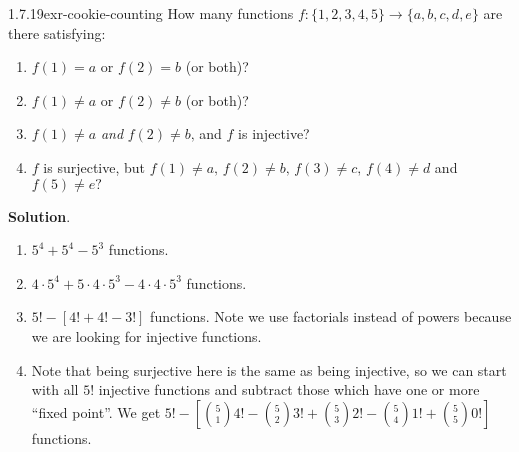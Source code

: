 \documentclass[twoside,11pt,]{book}
\numberwithin{equation}{chapter}
\begin{document}
\begin{divisionsolution}{1.7.19}{}{exr-cookie-counting}%
\hypertarget{p-2892}{}%
How many functions \(f: \{1,2,3,4,5\} \to \{a,b,c,d,e\}\) are there satisfying:\leavevmode%
\begin{enumerate}[label=(\alph*)]
\item\hypertarget{li-1684}{}\hypertarget{p-2893}{}%
\(f(1) = a\) or \(f(2) = b\) (or both)?%
\item\hypertarget{li-1685}{}\hypertarget{p-2895}{}%
\(f(1) \ne a\) or \(f(2) \ne b\) (or both)?%
\item\hypertarget{li-1686}{}\hypertarget{p-2897}{}%
\(f(1) \ne a\) \emph{and} \(f(2) \ne b\text{,}\) and \(f\) is injective?%
\item\hypertarget{li-1687}{}\hypertarget{p-2899}{}%
\(f\) is surjective, but \(f(1) \ne a\text{,}\) \(f(2) \ne b\text{,}\) \(f(3) \ne c\text{,}\) \(f(4) \ne d\) and \(f(5) \ne e\text{?}\)%
\end{enumerate}
%
\par\smallskip%
\noindent\textbf{Solution}.\quad%
\hypertarget{p-2901}{}%
\leavevmode%
\begin{enumerate}[label=(\alph*)]
\item\hypertarget{li-1688}{}\hypertarget{p-2902}{}%
\(5^4 + 5^4 - 5^3\) functions.%
\item\hypertarget{li-1689}{}\hypertarget{p-2903}{}%
\(4\cdot 5^4 + 5 \cdot 4 \cdot 5^3 - 4 \cdot 4 \cdot 5^3\) functions.%
\item\hypertarget{li-1690}{}\hypertarget{p-2904}{}%
\(5! - \left[ 4! + 4! - 3! \right]\) functions. Note we use factorials instead of powers because we are looking for injective functions.%
\item\hypertarget{li-1691}{}\hypertarget{p-2905}{}%
Note that being surjective here is the same as being injective, so we can start with all \(5!\) injective functions and subtract those which have one or more ``fixed point''. We get \(5! - \left[{5 \choose 1}4! - {5 \choose 2}3! + {5 \choose 3}2! - {5 \choose 4}1! + {5 \choose 5} 0!\right]\) functions.%
\end{enumerate}
%
\end{divisionsolution}%
\end{document}
